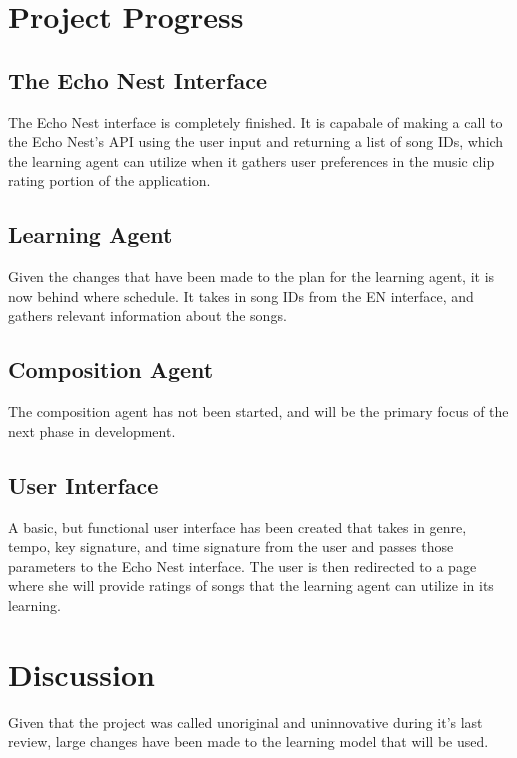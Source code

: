 \documentclass{article}
\begin{document}
\section{Project Progress}
\subsection{The Echo Nest Interface}
The Echo Nest interface is completely finished.  It is capabale of making a call to the Echo Nest's API using the 
user input and returning a list of song IDs, which the learning agent can utilize when it gathers user preferences
in the music clip rating portion of the application.

\subsection{Learning Agent}
Given the changes that have been made to the plan for the learning agent, it is now behind where schedule.
It takes in song IDs from the EN interface, and gathers relevant information about the songs.
\\

\subsection{Composition Agent}
The composition agent has not been started, and will be the primary focus of the next phase in development.

\subsection{User Interface}
A basic, but functional user interface has been created that takes in genre, tempo, key signature, and time
signature from the user and passes those parameters to the Echo Nest interface. The user is then redirected
to a page where she will provide ratings of songs that the learning agent can utilize in its learning.

\section{Discussion}
Given that the project was called unoriginal and uninnovative during it's last review, large changes have been
 made to the learning model that will be used. 
\end{document}
